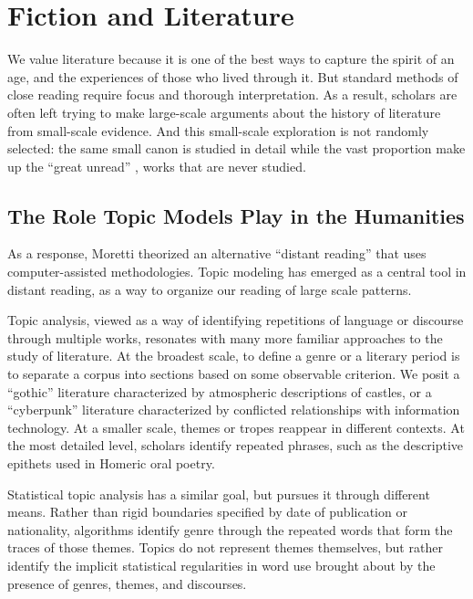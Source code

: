 
\chapter{Fiction and Literature}

\label{ch:fiction}

We value literature because it is one of the best ways to capture the spirit of an age, and the experiences of those who lived through it. But standard methods of close reading require focus and thorough interpretation. As a result, scholars are often left trying to make large-scale arguments about the history of literature from small-scale evidence. And this small-scale exploration is not randomly selected: the same small canon is studied in detail while the vast proportion make up the ``great unread'' \citep{moretti-00}, works that are never studied.

\section{The Role Topic Models Play in the Humanities}

As a response, Moretti theorized an alternative ``distant reading''  \citep{moretti-13} that uses computer-assisted methodologies. Topic modeling has emerged as a central tool in distant reading, as a way to organize our reading of large scale patterns.

Topic analysis, viewed as a way of identifying repetitions of language or discourse through multiple works, resonates with many more familiar approaches to the study of literature.
At the broadest scale, to define a genre or a literary period is to separate a corpus into sections based on some observable criterion.
We posit a ``gothic'' literature characterized by atmospheric descriptions of castles, or a ``cyberpunk'' literature characterized by conflicted relationships with information technology.
At a smaller scale, themes or tropes reappear in different contexts.
At the most detailed level, scholars identify repeated phrases, such as the descriptive epithets used in Homeric oral poetry.

Statistical topic analysis has a similar goal, but pursues it through different means.
Rather than rigid boundaries specified by date of publication or nationality, algorithms identify genre through the repeated words that form the traces of those themes.
Topics do not represent themes themselves, but rather identify the implicit statistical regularities in word use brought about by the presence of genres, themes, and discourses.


